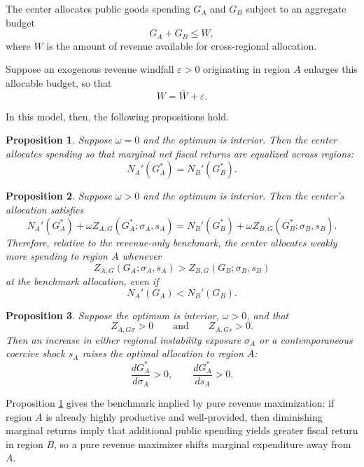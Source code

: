 \documentclass[12pt]{article}
\newtheorem{proposition}{Proposition}
\begin{document}
The center allocates public goods spending $G_A$ and $G_B$ subject to an aggregate budget
\begin{equation}
G_A+G_B\le W,
\end{equation}
where $W$ is the amount of revenue available for cross-regional allocation.

Suppose an exogenous revenue windfall $\varepsilon>0$ originating in region $A$ enlarges this allocable budget, so that
\begin{equation}
W=\bar W+\varepsilon.
\end{equation}

In this model, then, the following propositions hold.

\begin{proposition}\label{prop:tworegion_revenue_only}
Suppose $\omega=0$ and the optimum is interior. Then the center allocates spending so that marginal net fiscal returns are equalized across regions:
\[
N_A'(G_A^*) = N_B'(G_B^*).
\]
\end{proposition}

\begin{proposition}\label{prop:tworegion_resilience_shift}
Suppose $\omega>0$ and the optimum is interior. Then the center's allocation satisfies
\[
N_A'(G_A^*)+\omega Z_{A,G}(G_A^*;\sigma_A,s_A)
=
N_B'(G_B^*)+\omega Z_{B,G}(G_B^*;\sigma_B,s_B).
\]
Therefore, relative to the revenue-only benchmark, the center allocates weakly more spending to region $A$ whenever
\[
Z_{A,G}(G_A;\sigma_A,s_A)>Z_{B,G}(G_B;\sigma_B,s_B)
\]
at the benchmark allocation, even if
\[
N_A'(G_A)<N_B'(G_B).
\]
\end{proposition}

\begin{proposition}\label{prop:tworegion_instability}
Suppose the optimum is interior, $\omega > 0$, and that
\[
Z_{A,G\sigma}>0
\qquad \text{and} \qquad
Z_{A,Gs}>0.
\]
Then an increase in either regional instability exposure $\sigma_A$ or a contemporaneous coercive shock $s_A$ raises the optimal allocation to region $A$:
\[
\frac{dG_A^*}{d\sigma_A}>0,
\qquad
\frac{dG_A^*}{ds_A}>0.
\]
\end{proposition}

Proposition \ref{prop:tworegion_revenue_only} gives the benchmark implied by pure revenue maximization: if region $A$ is already highly productive and well-provided, then diminishing marginal returns imply that additional public spending yields greater fiscal return in region $B$, so a pure revenue maximizer shifts marginal expenditure away from $A$.
\end{document}
